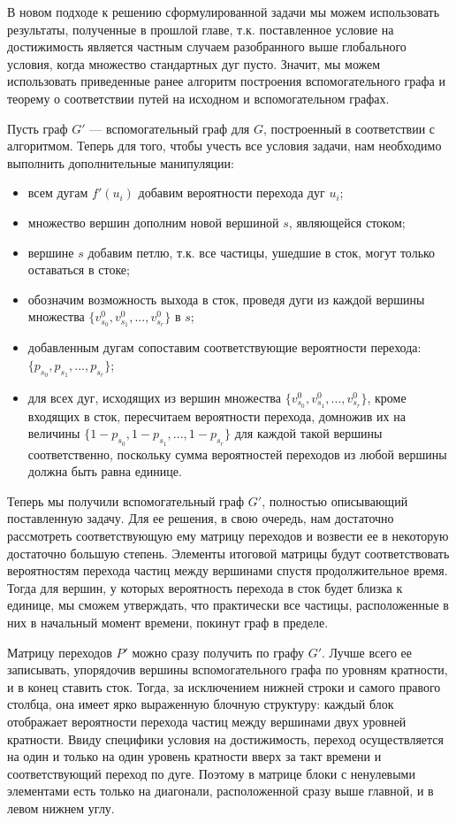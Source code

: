 В новом подходе к решению сформулированной задачи мы можем использовать результаты, полученные в прошлой главе, т.к. поставленное условие на достижимость является частным случаем разобранного выше глобального условия, когда множество стандартных дуг пусто. Значит, мы можем использовать приведенные ранее алгоритм построения вспомогательного графа и теорему о соответствии путей на исходном и вспомогательном графах.  

Пусть граф $G'$ --- вспомогательный граф для $G$, построенный в соответствии с алгоритмом. Теперь для того, чтобы учесть все условия задачи, нам необходимо выполнить дополнительные манипуляции:

\begin{itemize}
	\item всем дугам $f'(u_i)$ добавим вероятности перехода дуг $u_i$;
	\item множество вершин дополним новой вершиной $s$, являющейся стоком;
	\item вершине $s$ добавим петлю, т.к. все частицы, ушедшие в сток, могут только оставаться в стоке;
	\item обозначим возможность выхода в сток, проведя дуги из каждой вершины множества $\{v^0_{s_0}, v^0_{s_1}, ... , v^0_{s_r}\}$ в $s$;
	\item добавленным дугам сопоставим соответствующие вероятности перехода: $\{p_{s_0}, p_{s_1}, ... , p_{s_r}\}$;
	\item для всех дуг, исходящих из вершин множества $\{v^0_{s_0}, v^0_{s_1}, ... , v^0_{s_r}\}$, кроме входящих в сток, пересчитаем вероятности перехода, 
	домножив их на величины $\{ 1 - p_{s_0}, 1 - p_{s_1}, ... , 1 - p_{s_r}\}$ для каждой такой вершины соответственно, поскольку сумма вероятностей переходов из любой вершины должна быть равна единице.
\end{itemize}	

Теперь мы получили вспомогательный граф $G'$, полностью описывающий поставленную задачу. Для ее решения, в свою очередь, нам достаточно рассмотреть соответствующую ему матрицу переходов и возвести ее в некоторую достаточно большую степень. Элементы итоговой матрицы будут соответствовать вероятностям перехода частиц между вершинами спустя продолжительное время. Тогда для вершин, у которых вероятность перехода в сток будет близка к единице, мы сможем утверждать, что практически все частицы, расположенные в них в начальный момент времени, покинут граф в пределе. 

Матрицу переходов $P'$ можно сразу получить по графу $G'$. Лучше всего ее записывать, упорядочив вершины вспомогательного графа по уровням кратности, и в конец ставить сток. Тогда, за исключением нижней строки и самого правого столбца, она имеет ярко выраженную блочную структуру: каждый блок отображает вероятности перехода частиц между вершинами двух уровней кратности. Ввиду специфики условия на достижимость, переход осуществляется на один и только на один уровень кратности вверх за такт времени и соответствующий переход по дуге. Поэтому в матрице блоки с ненулевыми элементами есть только на диагонали, расположенной сразу выше главной, и в левом нижнем углу. 

